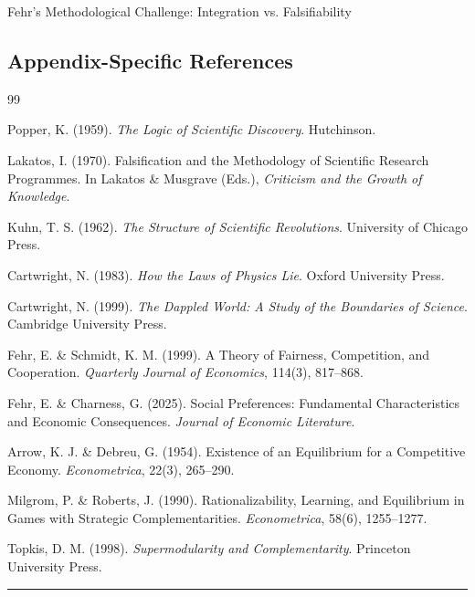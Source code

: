 \begin{chapter}{Fehr's Methodological Challenge: Integration vs. Falsifiability}
\subsection{Appendix-Specific References}

\begin{thebibliography}{99}

 Popper, K. (1959). \textit{The Logic of Scientific Discovery}. Hutchinson.

 Lakatos, I. (1970). Falsification and the Methodology of Scientific Research Programmes. In Lakatos \& Musgrave (Eds.), \textit{Criticism and the Growth of Knowledge}.

 Kuhn, T. S. (1962). \textit{The Structure of Scientific Revolutions}. University of Chicago Press.

 Cartwright, N. (1983). \textit{How the Laws of Physics Lie}. Oxford University Press.

 Cartwright, N. (1999). \textit{The Dappled World: A Study of the Boundaries of Science}. Cambridge University Press.

 Fehr, E. \& Schmidt, K. M. (1999). A Theory of Fairness, Competition, and Cooperation. \textit{Quarterly Journal of Economics}, 114(3), 817--868.

 Fehr, E. \& Charness, G. (2025). Social Preferences: Fundamental Characteristics and Economic Consequences. \textit{Journal of Economic Literature}.

 Arrow, K. J. \& Debreu, G. (1954). Existence of an Equilibrium for a Competitive Economy. \textit{Econometrica}, 22(3), 265--290.

 Milgrom, P. \& Roberts, J. (1990). Rationalizability, Learning, and Equilibrium in Games with Strategic Complementarities. \textit{Econometrica}, 58(6), 1255--1277.

 Topkis, D. M. (1998). \textit{Supermodularity and Complementarity}. Princeton University Press.

\end{thebibliography}


\vspace{1em}
\hrule
\vspace{0.5em}


\end{chapter}
